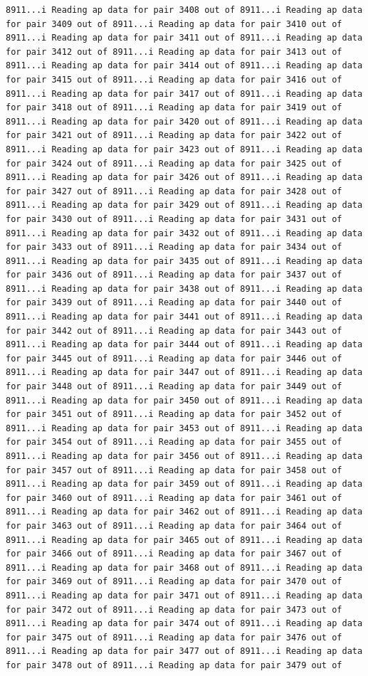 \documentclass[
]{article}
\begin{document}
\begin{verbatim}
8911...i Reading ap data for pair 3408 out of 8911...i Reading ap data for pair 3409 out of 8911...i Reading ap data for pair 3410 out of 8911...i Reading ap data for pair 3411 out of 8911...i Reading ap data for pair 3412 out of 8911...i Reading ap data for pair 3413 out of 8911...i Reading ap data for pair 3414 out of 8911...i Reading ap data for pair 3415 out of 8911...i Reading ap data for pair 3416 out of 8911...i Reading ap data for pair 3417 out of 8911...i Reading ap data for pair 3418 out of 8911...i Reading ap data for pair 3419 out of 8911...i Reading ap data for pair 3420 out of 8911...i Reading ap data for pair 3421 out of 8911...i Reading ap data for pair 3422 out of 8911...i Reading ap data for pair 3423 out of 8911...i Reading ap data for pair 3424 out of 8911...i Reading ap data for pair 3425 out of 8911...i Reading ap data for pair 3426 out of 8911...i Reading ap data for pair 3427 out of 8911...i Reading ap data for pair 3428 out of 8911...i Reading ap data for pair 3429 out of 8911...i Reading ap data for pair 3430 out of 8911...i Reading ap data for pair 3431 out of 8911...i Reading ap data for pair 3432 out of 8911...i Reading ap data for pair 3433 out of 8911...i Reading ap data for pair 3434 out of 8911...i Reading ap data for pair 3435 out of 8911...i Reading ap data for pair 3436 out of 8911...i Reading ap data for pair 3437 out of 8911...i Reading ap data for pair 3438 out of 8911...i Reading ap data for pair 3439 out of 8911...i Reading ap data for pair 3440 out of 8911...i Reading ap data for pair 3441 out of 8911...i Reading ap data for pair 3442 out of 8911...i Reading ap data for pair 3443 out of 8911...i Reading ap data for pair 3444 out of 8911...i Reading ap data for pair 3445 out of 8911...i Reading ap data for pair 3446 out of 8911...i Reading ap data for pair 3447 out of 8911...i Reading ap data for pair 3448 out of 8911...i Reading ap data for pair 3449 out of 8911...i Reading ap data for pair 3450 out of 8911...i Reading ap data for pair 3451 out of 8911...i Reading ap data for pair 3452 out of 8911...i Reading ap data for pair 3453 out of 8911...i Reading ap data for pair 3454 out of 8911...i Reading ap data for pair 3455 out of 8911...i Reading ap data for pair 3456 out of 8911...i Reading ap data for pair 3457 out of 8911...i Reading ap data for pair 3458 out of 8911...i Reading ap data for pair 3459 out of 8911...i Reading ap data for pair 3460 out of 8911...i Reading ap data for pair 3461 out of 8911...i Reading ap data for pair 3462 out of 8911...i Reading ap data for pair 3463 out of 8911...i Reading ap data for pair 3464 out of 8911...i Reading ap data for pair 3465 out of 8911...i Reading ap data for pair 3466 out of 8911...i Reading ap data for pair 3467 out of 8911...i Reading ap data for pair 3468 out of 8911...i Reading ap data for pair 3469 out of 8911...i Reading ap data for pair 3470 out of 8911...i Reading ap data for pair 3471 out of 8911...i Reading ap data for pair 3472 out of 8911...i Reading ap data for pair 3473 out of 8911...i Reading ap data for pair 3474 out of 8911...i Reading ap data for pair 3475 out of 8911...i Reading ap data for pair 3476 out of 8911...i Reading ap data for pair 3477 out of 8911...i Reading ap data for pair 3478 out of 8911...i Reading ap data for pair 3479 out of 
\end{verbatim}
\end{document}
